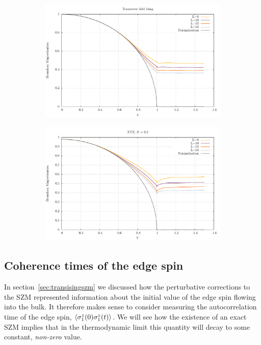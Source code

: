 \documentclass [a4paper, 11pt]{article}
\begin{document}
\begin{figure} [htbp]
\centering
\begin{subfigure}{.5\textwidth}
 \includegraphics[width=\linewidth]{Ising_pure_magnetisation.pdf}
\caption{}
\end{subfigure}%
\begin{subfigure}{.5\textwidth}
  \includegraphics[width=\linewidth]{XYZ_pure_magnetisation.pdf}
\caption{}
\end{subfigure}
\caption{}
\label{fig:bmisingxyz}
\end{figure}

\subsection{Coherence times of the edge spin}
In section~\ref{sec:transisingszm} we discussed how the perturbative corrections to the SZM represented information about the initial value of the edge spin flowing into the bulk. It therefore makes sense to consider measuring the autocorrelation time of the edge spin, $\Braket{\sigma^z_1(0)\sigma^z_1(t)}$. We will see how the existence of an exact SZM implies that in the thermodynamic limit this quantity will decay to some constant, \emph{non-zero} value.
\end{document}
